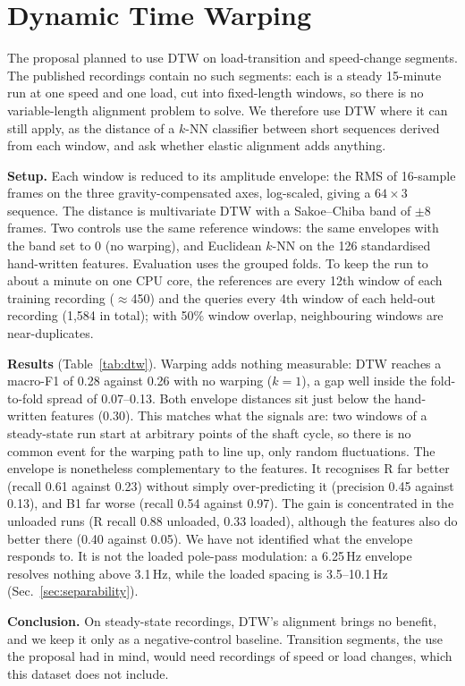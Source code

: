 
\section{Dynamic Time Warping}\label{sec:dtw}

The proposal planned to use DTW on load-transition and speed-change segments. The
published recordings contain no such segments: each is a steady 15-minute run at one
speed and one load, cut into fixed-length windows, so there is no variable-length
alignment problem to solve. We therefore use DTW where it can still apply, as the distance
of a $k$-NN classifier between short sequences derived from each window, and ask whether
elastic alignment adds anything.

\textbf{Setup.} Each window is reduced to its amplitude envelope: the RMS of 16-sample
frames on the three gravity-compensated axes, log-scaled, giving a $64\times3$ sequence.
The distance is multivariate DTW with a Sakoe--Chiba band of $\pm$8 frames. Two controls
use the same reference windows: the same envelopes with the band set to 0 (no warping),
and Euclidean $k$-NN on the 126 standardised hand-written features. Evaluation uses the
grouped folds. To keep the run to about a minute on one CPU core, the references are every
12th window of each training recording ($\approx$450) and the queries every 4th window of
each held-out recording (1,584 in total); with 50\% window overlap, neighbouring windows
are near-duplicates.

\begin{table}[t]
  \centering
  \caption{$k$-NN on window envelopes (grouped CV, mean $\pm$ std over 6 folds; recalls
  pooled over folds). Chance macro-F1 is 0.17.}
  \label{tab:dtw}
  \resizebox{\columnwidth}{!}{}
\end{table}

\textbf{Results} (Table~\ref{tab:dtw}). Warping adds nothing measurable: DTW reaches a
macro-F1 of 0.28 against 0.26 with no warping ($k=1$), a gap well inside the
fold-to-fold spread of 0.07--0.13. Both envelope distances sit just below the hand-written
features (0.30). This matches what the signals are: two windows of a steady-state run
start at arbitrary points of the shaft cycle, so there is no common event for the warping
path to line up, only random fluctuations. The envelope is nonetheless complementary to
the features. It recognises R far better (recall 0.61 against 0.23) without simply
over-predicting it (precision 0.45 against 0.13), and B1 far worse (recall 0.54 against
0.97). The gain is concentrated in the unloaded runs (R recall 0.88 unloaded, 0.33
loaded), although the features also do better there (0.40 against 0.05). We have not
identified what the envelope responds to. It is not the loaded pole-pass modulation: a
6.25\,Hz envelope resolves nothing above 3.1\,Hz, while the loaded spacing is
3.5--10.1\,Hz (Sec.~\ref{sec:separability}).

\textbf{Conclusion.} On steady-state recordings, DTW's alignment brings no benefit, and we
keep it only as a negative-control baseline. Transition segments, the use the proposal had
in mind, would need recordings of speed or load changes, which this dataset does not
include.
